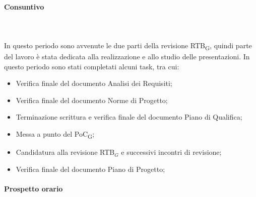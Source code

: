 \paragraph{Consuntivo} \hspace{1cm} 
\\ \hspace{1cm} \\
In questo periodo sono avvenute le due parti della revisione RTB\textsubscript{G}, quindi parte del lavoro è stata dedicata alla realizzazione e allo studio delle presentazioni.
In questo periodo sono stati completati alcuni task, tra cui:
\begin{itemize}
 \item Verifica finale del documento Analisi dei Requisiti;
    \item Verifica finale del documento Norme di Progetto;
    \item Terminazione scrittura e verifica finale del documento Piano di Qualifica;
    \item Messa a punto del PoC\textsubscript{G};
    \item Candidatura alla revisione RTB$_G$ e successivi incontri di revisione;
    \item Verifica finale del documento Piano di Progetto;
\end{itemize}

\paragraph{Prospetto orario} \hspace{1cm}
\begin{table}[H]
\centering
{}
\caption{Consuntivo dell'impegno orario di ciascun membro durante il periodo V}
\end{table}

